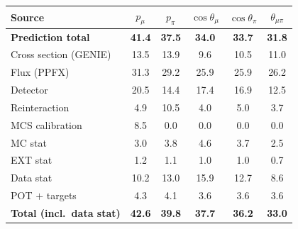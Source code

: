 \documentclass[11pt,a4paper]{article}
\begin{document}
\begin{center}\scriptsize
{}
\label{tab:systbreak_rhc}
\begin{tabular}{lccccc}
\toprule
Source & $p_\mu$ & $p_\pi$ & $\cos\theta_\mu$ & $\cos\theta_\pi$ & $\theta_{\mu\pi}$ \\
\midrule
\textbf{Prediction total} & \textbf{41.4} & \textbf{37.5} & \textbf{34.0} & \textbf{33.7} & \textbf{31.8} \\
Cross section (GENIE) & 13.5 & 13.9 & 9.6 & 10.5 & 11.0 \\
Flux (PPFX) & 31.3 & 29.2 & 25.9 & 25.9 & 26.2 \\
Detector & 20.5 & 14.4 & 17.4 & 16.9 & 12.5 \\
Reinteraction & 4.9 & 10.5 & 4.0 & 5.0 & 3.7 \\
MCS calibration & 8.5 & 0.0 & 0.0 & 0.0 & 0.0 \\
MC stat & 3.0 & 3.8 & 4.6 & 3.7 & 2.5 \\
EXT stat & 1.2 & 1.1 & 1.0 & 1.0 & 0.7 \\
Data stat & 10.2 & 13.0 & 15.9 & 12.7 & 8.6 \\
POT $+$ targets & 4.3 & 4.1 & 3.6 & 3.6 & 3.6 \\
\textbf{Total (incl.\ data stat)} & \textbf{42.6} & \textbf{39.8} & \textbf{37.7} & \textbf{36.2} & \textbf{33.0} \\
\bottomrule
\end{tabular}
\end{center}
\end{document}
